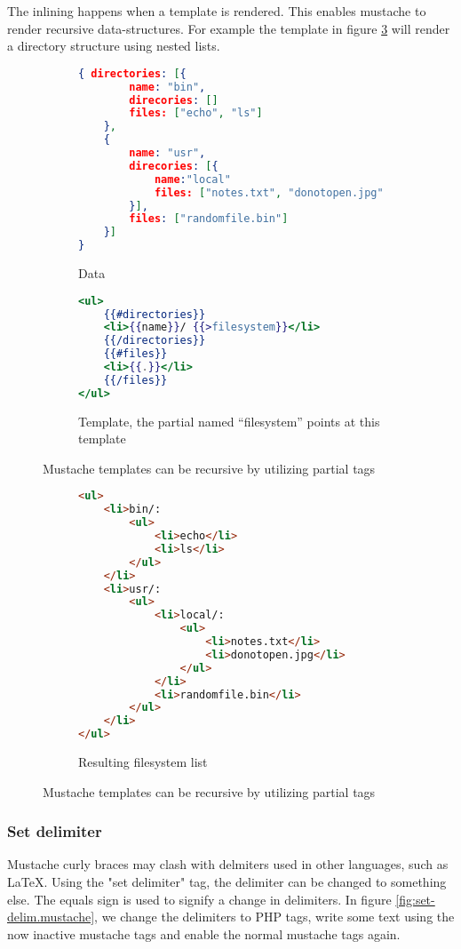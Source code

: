 \documentclass[thesis.tex]{subfiles}
\begin{document}
The inlining happens when a template is rendered. This enables mustache to
render recursive data-structures. For example the template in figure
\ref{fig:partial-example} will render a directory structure using nested lists.

\begin{figure}
	\centering
	\begin{subfigure}{\textwidth}
		\caption{Data}
		\label{fig:partial-example.data}
		\begin{lstlisting}[language=JSON]
{ directories: [{
		name: "bin",
		direcories: []
		files: ["echo", "ls"]
	},
	{
		name: "usr",
		direcories: [{
			name:"local"
			files: ["notes.txt", "donotopen.jpg"]
		}],
		files: ["randomfile.bin"]
	}]
}
		\end{lstlisting}
	\end{subfigure}
	
	\begin{subfigure}{\textwidth}
		\caption{Template, the partial named ``filesystem'' points at this template}
		\label{fig:partial-example.mustache}
		\begin{lstlisting}[language=mustache]
<ul>
	{{#directories}}
	<li>{{name}}/ {{>filesystem}}</li>
	{{/directories}}
	{{#files}}
	<li>{{.}}</li>
	{{/files}}
</ul>
		\end{lstlisting}
	\end{subfigure}
	\caption{Mustache templates can be recursive by utilizing partial tags}
	\label{fig:partial-example}
\end{figure}
	
\begin{figure}
	\ContinuedFloat
	\centering
	\begin{subfigure}{\textwidth}
		\caption{Resulting filesystem list}
		\label{fig:partial-example.html}
		\begin{lstlisting}[language=HTML]
<ul>
	<li>bin/:
		<ul>
			<li>echo</li>
			<li>ls</li>
		</ul>
	</li>
	<li>usr/:
		<ul>
			<li>local/:
				<ul>
					<li>notes.txt</li>
					<li>donotopen.jpg</li>
				</ul>
			</li>
			<li>randomfile.bin</li>
		</ul>
	</li>
</ul>
		\end{lstlisting}
	\end{subfigure}
	\caption{Mustache templates can be recursive by utilizing partial tags}
\end{figure}

\subsubsection{Set delimiter}
Mustache curly braces may clash with delmiters used in other languages,
such as LaTeX. Using the "set delimiter" tag, the delimiter can be changed to
something else. The equals sign is used to signify a change in delimiters.
In figure \ref{fig:set-delim.mustache}, we change the delimiters
to PHP tags, write some text using the now inactive mustache tags and enable the
normal mustache tags again.
\end{document}
